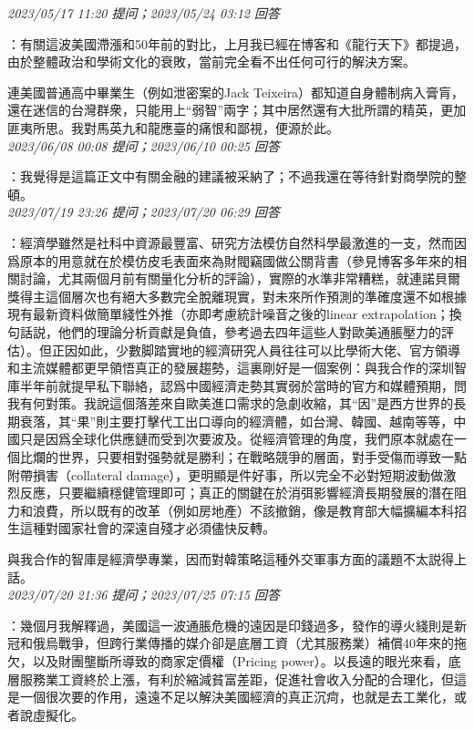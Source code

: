 \documentclass[twocolumn]{ctexart}
\begin{document}
\textit{\hfill\noindent\small 2023/05/17 11:20 提问；2023/05/24 03:12 回答}

：有關這波美國滯漲和50年前的對比，上月我已經在博客和《龍行天下》都提過，由於整體政治和學術文化的衰敗，當前完全看不出任何可行的解決方案。

連美國普通高中畢業生（例如泄密案的Jack Teixeira）都知道自身體制病入膏肓，還在迷信的台灣群衆，只能用上“弱智”兩字；其中居然還有大批所謂的精英，更加匪夷所思。我對馬英九和龍應臺的痛恨和鄙視，便源於此。
\\

\textit{\hfill\noindent\small 2023/06/08 00:08 提问；2023/06/10 00:25 回答}

：我覺得是這篇正文中有關金融的建議被采納了；不過我還在等待針對商學院的整頓。
\\

\textit{\hfill\noindent\small 2023/07/19 23:26 提问；2023/07/20 06:29 回答}

：經濟學雖然是社科中資源最豐富、研究方法模仿自然科學最激進的一支，然而因爲原本的用意就在於模仿皮毛表面來為財閥竊國做公關背書（參見博客多年來的相關討論，尤其兩個月前有關量化分析的評論），實際的水準非常糟糕，就連諾貝爾獎得主這個層次也有絕大多數完全脫離現實，對未來所作預測的準確度還不如根據現有最新資料做簡單綫性外推（亦即考慮統計噪音之後的linear extrapolation；換句話説，他們的理論分析貢獻是負值，參考過去四年這些人對歐美通脹壓力的評估）。但正因如此，少數脚踏實地的經濟研究人員往往可以比學術大佬、官方領導和主流媒體都更早領悟真正的發展趨勢，這裏剛好是一個案例：與我合作的深圳智庫半年前就提早私下聯絡，認爲中國經濟走勢其實弱於當時的官方和媒體預期，問我有何對策。我說這個落差來自歐美進口需求的急劇收縮，其“因”是西方世界的長期衰落，其“果”則主要打擊代工出口導向的經濟體，如台灣、韓國、越南等等，中國只是因爲全球化供應鏈而受到次要波及。從經濟管理的角度，我們原本就處在一個比爛的世界，只要相對强勢就是勝利；在戰略競爭的層面，對手受傷而導致一點附帶損害（collateral damage），更明顯是件好事，所以完全不必對短期波動做激烈反應，只要繼續穩健管理即可；真正的關鍵在於消弭影響經濟長期發展的潛在阻力和浪費，所以既有的改革（例如房地產）不該撤銷，像是教育部大幅擴編本科招生這種對國家社會的深遠自殘才必須儘快反轉。

與我合作的智庫是經濟學專業，因而對韓策略這種外交軍事方面的議題不太説得上話。
\\

\textit{\hfill\noindent\small 2023/07/20 21:36 提问；2023/07/25 07:15 回答}

：幾個月我解釋過，美國這一波通脹危機的遠因是印錢過多，發作的導火綫則是新冠和俄烏戰爭，但跨行業傳播的媒介卻是底層工資（尤其服務業）補償40年來的拖欠，以及財團壟斷所導致的商家定價權（Pricing power）。以長遠的眼光來看，底層服務業工資終於上漲，有利於縮減貧富差距，促進社會收入分配的合理化，但這是一個很次要的作用，遠遠不足以解決美國經濟的真正沉疴，也就是去工業化，或者說虛擬化。
\end{document}
